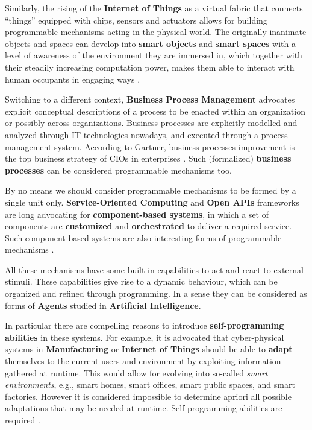 Similarly, the rising of the \textbf{Internet of Things} as a
virtual fabric that connects ``things''
equipped with chips, sensors and actuators allows for building
programmable mechanisms acting in the physical world.  The originally
inanimate objects and spaces can develop into \textbf{smart objects}
and \textbf{smart spaces} with a level of awareness of the environment
they are immersed in, which together with their steadily increasing
computation power, makes them able to interact with human occupants
in engaging ways \autocite[]{MacGillivray16}. %


Switching to a different context, \textbf{Business Process
  Management} advocates explicit conceptual descriptions of a process
to be enacted within an organization or possibly across
organizations. Business processes are explicitly modelled and analyzed
through IT technologies nowadays, and executed through a process
management system. According to Gartner, business processes
improvement is the top business strategy of CIOs in enterprises
\autocite[]{Gartner11}. Such (formalized) \textbf{business processes} can be
considered programmable mechanisms too.

By no means we should consider programmable mechanisms to be formed by a single unit only. \textbf{Service-Oriented Computing} and \textbf{Open APIs} frameworks are long advocating for \textbf{component-based systems}, in which a set of components are \textbf{customized} and \textbf{orchestrated} to deliver a required service. Such component-based systems are also interesting forms of programmable mechanisms \autocite[]{wsf2014}.


All these mechanisms have some built-in capabilities to act and react
to external stimuli.
These capabilities give rise to a
dynamic behaviour, which can be organized and refined through
programming.
%
 In a sense they can be considered as forms of
\textbf{Agents} studied in \textbf{Artificial Intelligence}. %
\autocite[]{Reiter01} \autocite[]{Wooldridge09}


In particular there are compelling reasons to introduce \textbf{self-programming
abilities} in these systems.
For example, it is advocated that cyber-physical systems in
\textbf{Manufacturing} or \textbf{Internet of Things} should be able
to \textbf{adapt} themselves to the current users and environment by
exploiting information gathered at runtime. This would allow for
evolving into so-called \emph{smart environments}, e.g., smart homes,
smart offices, smart public spaces, and smart factories. However it is
considered impossible to determine apriori all possible adaptations
that may be needed at runtime. Self-programming abilities are required
\autocite[]{Seiger2016}.

